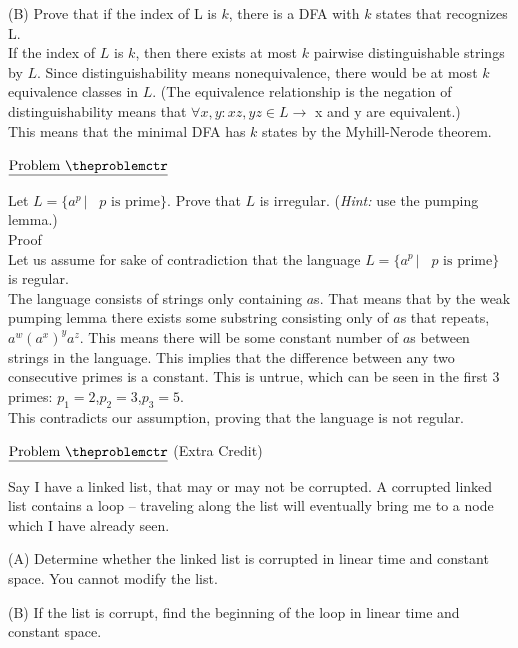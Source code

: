 \documentclass[11pt]{article}
\def\pp{\par\noindent}
\begin{document}
\noindent (B) Prove that if the index of L is $k$, there is a DFA with $k$ states that recognizes L.\\
If the index of $L$ is $k$, then there exists at most $k$ pairwise distinguishable strings by $L$. Since distinguishability means nonequivalence, there would be at most $k$ equivalence classes in $L$. (The equivalence relationship is the negation of distinguishability means that  $\forall x,y: xz,yz\in L\rightarrow$ x and y are equivalent.)\\
This means that the minimal DFA has $k$ states by the Myhill-Nerode theorem.

\bigskip
\addtocounter{problemctr}{1}
\noindent $\underline{\rm Problem\ \theproblemctr}$\pp
Let $L = \{ a^p\, |\, \mbox{ $p$ is prime} \}$. Prove that $L$ is irregular.
(\textit{Hint:} use the pumping lemma.)\\
Proof\\
Let us assume for sake of contradiction that the language $L = \{ a^p\, |\, \mbox{ $p$ is prime} \}$ is regular.\\
The language consists of strings only containing $a$s. That means that by the weak pumping lemma there exists some substring consisting only of $a$s that repeats, $a^w(a^x)^ya^z$. This means there will be some constant number of $a$s between strings in the language. This implies that the difference between any two consecutive primes is a constant. This is untrue, which can be seen in the first 3 primes: $p_1=2$,$p_2=3$,$p_3=5$.\\
This contradicts our assumption, proving that the language is not regular.

\newpage

\addtocounter{problemctr}{1}
\bigskip
\noindent
$\underline{\rm Problem\ \theproblemctr}$ (Extra Credit)\pp
\noindent

\noindent Say I have a linked list, that may or may not be corrupted. A corrupted linked
list contains a loop -- traveling along the list will eventually bring me to a
node which I have already seen.

\bigskip
\noindent (A) Determine whether the linked list is corrupted in linear time
and constant space. You cannot modify the list.

\bigskip
\noindent (B) If the list is corrupt, find the beginning of the loop in
linear time and constant space.
\end{document}
